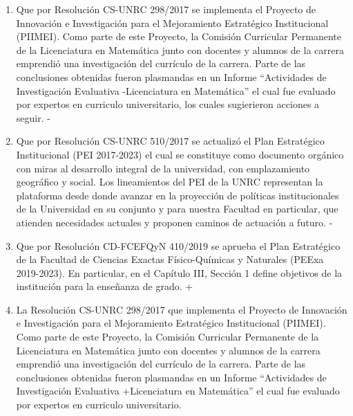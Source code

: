 \begin{enumerate}
- \item Que por Resolución CS-UNRC 298/2017 se implementa el Proyecto de Innovación e Investigación para el Mejoramiento Estratégico Institucional (PIIMEI). Como parte de este Proyecto, la Comisión Curricular Permanente de la Licenciatura en Matemática junto con docentes y alumnos de la carrera emprendió una investigación del currículo de la carrera.  Parte de las conclusiones obtenidas fueron plasmandas en un Informe ``Actividades de Investigación Evaluativa
-Licenciatura en Matemática'' el cual fue evaluado por expertos en curriculo universitario, los cuales sugierieron acciones a seguir.
-\item Que por Resolución CS-UNRC 510/2017 se actualizó el Plan Estratégico Institucional (PEI 2017-2023) el cual se constituye como documento orgánico con miras al desarrollo integral de la universidad, con emplazamiento geográfico y social. Los lineamientos del PEI de la UNRC representan la plataforma desde donde avanzar en la proyección de políticas institucionales de la Universidad en su conjunto y para nuestra Facultad en particular, que atienden necesidades actuales y proponen caminos de actuación a futuro.
-\item Que por Resolución CD-FCEFQyN 410/2019 se aprueba el Plan Estratégico de la Facultad de Ciencias Exactas Físico-Químicas y Naturales (PEExa 2019-2023). En particular, en el Capítulo III, Sección 1 define objetivos de la institución para la enseñanza de grado.   
+ \item La Resolución CS-UNRC 298/2017 que implementa el Proyecto de Innovación e Investigación para el Mejoramiento Estratégico Institucional (PIIMEI). Como parte de este Proyecto, la Comisión Curricular Permanente de la Licenciatura en Matemática junto con docentes y alumnos de la carrera emprendió una investigación del currículo de la carrera.  Parte de las conclusiones obtenidas fueron plasmandas en un Informe ``Actividades de Investigación Evaluativa
+Licenciatura en Matemática'' el cual fue evaluado por expertos en curriculo universitario.
 

\end{enumerate}
